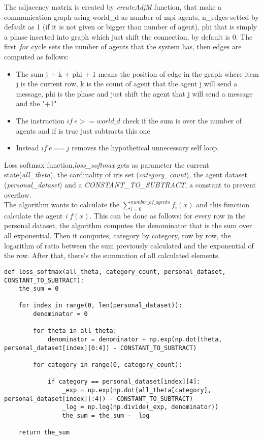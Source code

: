\documentclass[a4paper,11pt,oneside]{book}
\begin{document}
The adjacency matrix is created by \textit{createAdjM} function, that make a communication graph using world\_d as number of
mpi agents, n\_edges  setted by default as 1 (if it is not given or
bigger than number of agent), phi that is simply a phase inserted into
graph which just shift the connection, by default is 0. The first $for$
cycle sets the number of agents that the system has, then edges are
computed as follows:
\begin{itemize}
    \item The sum j + k + phi + 1 means the position of edge in the
    graph where item j is the current row, k is the count of agent 
    that the agent j will send a message, phi is the phase and just
    shift the agent that j will send a message and the "+1" 

    \item The instruction $ if \ e >= world\_d $  check if the sum is over the number of
    agents and if is true just subtracts this one

    \item Instead $ if \ e \ $==$ \  j $ removes the hypothetical unnecessary self loop.
\end{itemize}


Loss softmax function,\textit{loss\_softmax} gets as parameter the current state(\textit{all\_theta}), the cardinality of
iris set (\textit{category\_count}), the agent dataset (\textit{personal\_dataset}) and a \textit{CONSTANT\_TO\_SUBTRACT}, a
constant to prevent overflow.\\
The algorithm wants to calculate the $\displaystyle\sum_{i=0}^{number\_of\_agents} f_{i}(x)$ and this function calculate the
agent \textit{i} $f(x)$. This can be done as follows: for every row in the personal dataset, the algorithm computes the
denominator that is the sum over all exponential. Then it computes, category by category, row by row, the logarithm of ratio
between the sum previously calculated and the exponential of the row. After that, there's the summation of all calculated
elements.

\begin{lstlisting}
def loss_softmax(all_theta, category_count, personal_dataset, CONSTANT_TO_SUBTRACT):
    the_sum = 0

    for index in range(0, len(personal_dataset)):
        denominator = 0

        for theta in all_theta:
            denominator = denominator + np.exp(np.dot(theta, personal_dataset[index][0:4]) - CONSTANT_TO_SUBTRACT)

        for category in range(0, category_count):

            if category == personal_dataset[index][4]:
                _exp = np.exp(np.dot(all_theta[category], personal_dataset[index][:4]) - CONSTANT_TO_SUBTRACT)
                _log = np.log(np.divide(_exp, denominator))
                the_sum = the_sum - _log

    return the_sum
\end{lstlisting}
\end{document}
